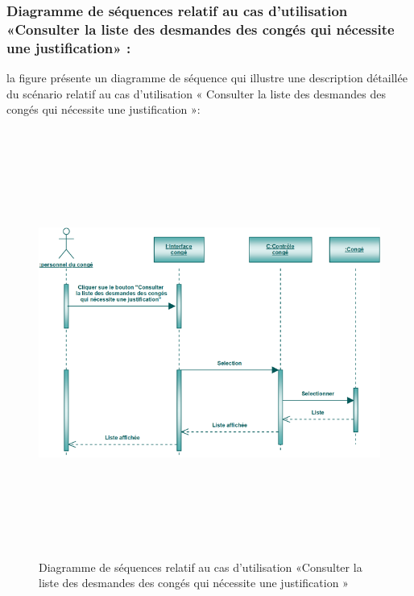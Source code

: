 \documentclass[12 pt ]{report}
\begin{document}
\subsubsection{Diagramme de séquences relatif au cas d’utilisation «Consulter la liste des desmandes des congés qui nécessite une justification» :}
la figure   présente un diagramme de séquence qui illustre une description détaillée du scénario relatif au cas d’utilisation « Consulter la liste des desmandes des congés qui nécessite une
justification »: 
\begin{figure}[h]
 \begin{center}
\includegraphics[width= 15 cm ,height=  14cm]{sec_con_con_jus.PNG}
\caption{Diagramme de séquences relatif au cas d’utilisation «Consulter la liste des desmandes des congés qui nécessite une
justification »}

\end{center}
\end{figure}
\newpage
\end{document}
